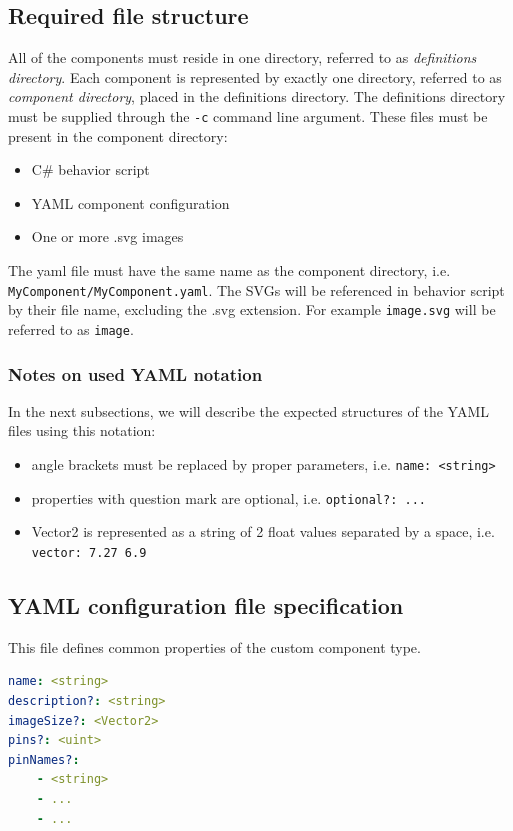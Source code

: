 \subsection{Required file structure}
All of the components must reside in one directory, referred to as \textit{definitions directory}. Each component is represented by exactly one directory, referred to as \textit{component directory}, placed in the definitions directory. The definitions directory must be supplied through the \texttt{-c} command line argument. These files must be present in the component directory:

\begin{itemize}
    \item C\# behavior script
    \item YAML component configuration
    \item One or more .svg images
\end{itemize}

The yaml file must have the same name as the component directory, i.e. \texttt{MyComponent/MyComponent.yaml}. The SVGs will be referenced in behavior script by their file name, excluding the .svg extension. For example \texttt{image.svg} will be referred to as \texttt{image}.

\subsubsection{Notes on used YAML notation} \label{yaml_notation}
In the next subsections, we will describe the expected structures of the YAML files using this notation:
\begin{itemize}
  \item angle brackets must be replaced by proper parameters, i.e. \texttt{name: <string>}
  \item properties with question mark are optional, i.e. \texttt{optional?: ...}
  \item Vector2 is represented as a string of 2 float values separated by a space, i.e. \texttt{vector: 7.27 6.9} 
\end{itemize}

\subsection{YAML configuration file specification}
This file defines common properties of the custom component type.

\begin{lstlisting}[language=yaml, caption={YAML configuration file structure}]
name: <string>
description?: <string>
imageSize?: <Vector2>
pins?: <uint>
pinNames?:
    - <string>
    - ...
    - ...
\end{lstlisting}

